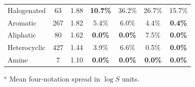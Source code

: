 \documentclass[twoside,twocolumn,9pt]{article}
\newcommand{\logS}{\ensuremath{\log S}}
\providecommand{\DIFaddbegin}{} %
\providecommand{\DIFaddend}{} %
\providecommand{\DIFdelend}{} %
\providecommand{\DIFaddendFL}{} %
\providecommand{\DIFdelbeginFL}{} %
\providecommand{\DIFscaledelfig}{0.5}
\newlength{\DIFdelgraphicswidth} %
\newlength{\DIFdelgraphicsheight} %
\providecommand{\DIFaddincludegraphics}[2][]{{\color{blue}\fbox{\DIFOincludegraphics[#1]{#2}}}} %
\providecommand{\DIFdelincludegraphics}[2][]{%
\sbox{\DIFdelgraphicsbox}{\DIFOincludegraphics[#1]{#2}}%
\settoboxwidth{\DIFdelgraphicswidth}{\DIFdelgraphicsbox} %
\settoboxtotalheight{\DIFdelgraphicsheight}{\DIFdelgraphicsbox} %
\scalebox{\DIFscaledelfig}{%
\parbox[b]{\DIFdelgraphicswidth}{\usebox{\DIFdelgraphicsbox}\\[-\baselineskip] \rule{\DIFdelgraphicswidth}{0em}}\llap{\resizebox{\DIFdelgraphicswidth}{\DIFdelgraphicsheight}{%
\setlength{\unitlength}{\DIFdelgraphicswidth}%
\begin{picture}(1,1)%
\thicklines\linethickness{2pt} %
{\color[rgb]{1,0,0}\put(0,0){\framebox(1,1){}}}%
{\color[rgb]{1,0,0}\put(0,0){\line( 1,1){1}}}%
{\color[rgb]{1,0,0}\put(0,1){\line(1,-1){1}}}%
\end{picture}%
}\hspace*{3pt}}} %
} %
\DeclareRobustCommand{\DIFaddbegin}{\DIFOaddbegin \let\includegraphics\DIFaddincludegraphics} %
\DeclareRobustCommand{\DIFaddend}{\DIFOaddend \let\includegraphics\DIFOincludegraphics} %
\DeclareRobustCommand{\DIFdelend}{\DIFOaddend \let\includegraphics\DIFOincludegraphics} %
\DeclareRobustCommand{\DIFaddendFL}{\DIFOaddendFL \let\includegraphics\DIFOincludegraphics} %
\DeclareRobustCommand{\DIFdelbeginFL}{\DIFOdelbeginFL \let\includegraphics\DIFdelincludegraphics} %
\begin{document}
\begin{table}[t]
\begin{tabular*}{\textwidth}{@{\extracolsep{\fill}}lcccccc}
Halogenated      & 63  & 1.88 & \textbf{10.7\%} & 36.2\% & 26.7\% & 15.7\% \\
Aromatic         & 267 & 1.82 & 5.4\% & 6.0\% & 4.4\% & \textbf{0.4\%} \\
Aliphatic        & 80  & 1.62 & \textbf{0.0\%} & \textbf{0.0\%} & 7.5\% & \textbf{0.0\%} \\
Heterocyclic     & 427 & 1.44 & 3.9\% & 6.6\% & 0.5\% & \textbf{0.0\%} \\
Amine            & 7   & 1.10 & \textbf{0.0\%} & \textbf{0.0\%} & \textbf{0.0\%} & \textbf{0.0\%} \\
\hline
\end{tabular*}
\DIFaddendFL $^a$ Mean four-notation spread in $\logS$ units.
\DIFdelbeginFL %
\DIFdelend \DIFaddbegin \end{table}
\DIFaddend 
\end{document}
